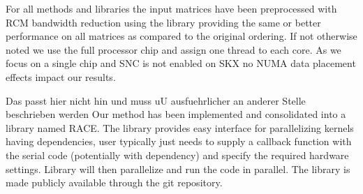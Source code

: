For all methods and libraries the input matrices have been preprocessed with \acrshort{RCM} bandwidth reduction using the \SPMP library \cite{SpMP} providing the same or better performance on all matrices as compared to the original ordering. If not otherwise noted we use the full processor chip and assign one thread to each core. As we focus on a single chip and SNC is not enabled on SKX no NUMA data placement effects impact our results.  



{\GW Das passt hier nicht hin und muss uU ausfuehrlicher an anderer Stelle beschrieben werden  Our method has been implemented and consolidated into a library named \acrshort{RACE}. The library provides easy interface for parallelizing kernels having dependencies, user typically just needs to supply a callback function with the serial code (potentially with dependency) and specify the required hardware settings. Library will then parallelize and run the code in parallel. The library is made publicly available through the git repository.}  %
 

